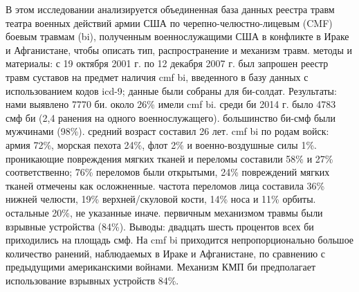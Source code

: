 В этом исследовании анализируется объединенная база данных реестра травм театра
военных действий армии США по черепно-челюстно-лицевым (CMF) боевым травмам
(bi), полученным военнослужащими США в конфликте в Ираке и Афганистане, чтобы
описать тип, распространение и механизм травм. методы и материалы: с 19 октября
2001 г. по 12 декабря 2007 г. был запрошен реестр травм суставов на предмет
наличия cmf bi, введенного в базу данных с использованием кодов icd-9; данные
были собраны для би-солдат. Результаты: нами выявлено 7770 би. около 26\% имели
cmf bi. среди би 2014 г. было 4783 смф би (2,4 ранения на одного
военнослужащего). большинство би-смф были мужчинами (98\%). средний возраст
составил 26 лет. cmf bi по родам войск: армия 72\%, морская пехота 24\%, флот
2\% и военно-воздушные силы 1\%. проникающие повреждения мягких тканей и
переломы составили 58\% и 27\% соответственно; 76\% переломов были открытыми,
24\% повреждений мягких тканей отмечены как осложненные. частота переломов лица
составила 36\% нижней челюсти, 19\% верхней/скуловой кости, 14\% носа и 11\%
орбиты. остальные 20\%, не указанные иначе. первичным механизмом травмы были
взрывные устройства (84\%). Выводы: двадцать шесть процентов всех би приходились
на площадь смф. На cmf bi приходится непропорционально большое количество
ранений, наблюдаемых в Ираке и Афганистане, по сравнению с предыдущими
американскими войнами. Механизм КМП би предполагает использование взрывных
устройств 84\%.\cite{hale2010}

